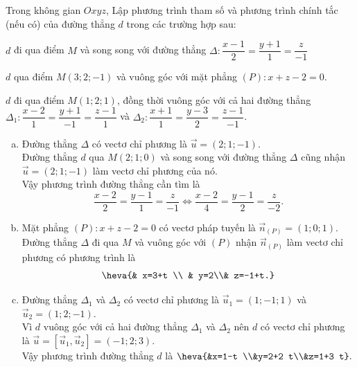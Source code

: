 \begin{vd}
	Trong không gian $Oxyz$, Lập phương trình tham số và phương trình chính tắc (nếu có) của đường thẳng $d$ trong các trường hợp sau:
	\begin{enumEX}[a)]{1}
		\item $d$ đi qua điểm $M$ và song song với đường thẳng $\Delta \colon \dfrac{x-1}{2}=\dfrac{y+1}{1}=\dfrac{z}{-1}$
		\item $d$ qua điểm $M(3;2;-1)$ và vuông góc với mặt phẳng $(P)\colon x+z-2=0$.
		\item $d$ đi qua điểm $M(1; 2; 1)$, đồng thời vuông góc với cả hai đường thẳng $\Delta_{1}\colon \dfrac{x-2}{1}=\dfrac{y+1}{-1}=\dfrac{z-1}{1}$ và $\Delta_{2}\colon \dfrac{x+1}{1}=\dfrac{y-3}{2}=\dfrac{z-1}{-1}$.
	\end{enumEX}

	\loigiai
	{
		\begin{enumerate}[a)]
			\item Đường thẳng $\Delta$ có vectơ chỉ phương là $\vec{u}=(2;1;-1)$.\\
			Đường thẳng $d$ qua $M(2;1;0)$ và song song với đường thẳng $\Delta$ cũng nhận $\vec{u}=(2;1;-1)$ làm vectơ chỉ phương của nó.\\
			Vậy phương trình đường thẳng cần tìm là
			\[\dfrac{x-2}{2}=\dfrac{y-1}{1}=\dfrac{z}{-1} \Leftrightarrow\dfrac{x-2}{4}=\dfrac{y-1}{2}=\dfrac{z}{-2}.\]
			\item Mặt phẳng $(P)\colon x+z-2=0$ có vectơ pháp tuyến là $\overrightarrow{n}_{(P)}=(1;0;1)$.\\
			Đường thẳng $\Delta$ đi qua $M$ và vuông góc với $(P)$ nhận $\overrightarrow{n}_{(P)}$ làm vectơ chỉ phương có phương trình là
			$$\heva{& x=3+t \\ & y=2\\& z=-1+t.}$$
			\item Đường thẳng $\Delta_{1}$ và $\Delta_{2}$ có vectơ chỉ phương là $\vec{u}_1 =(1;-1;1)$ và $\vec{u}_2=(1;2;-1)$.\\
			Vì $d$ vuông góc với cả hai đường thẳng $\Delta_{1}$ và $\Delta_{2}$ nên $d$ có vectơ chỉ phương là $\vec{u}=\left[\vec{u}_{1}, \vec{u}_{2}\right]=(-1; 2; 3)$.\\
			Vậy phương trình đường thẳng $d$ là $\heva{&x=1-t \\&y=2+2 t\\&z=1+3 t}.$
		\end{enumerate}
		
	}
\end{vd}
